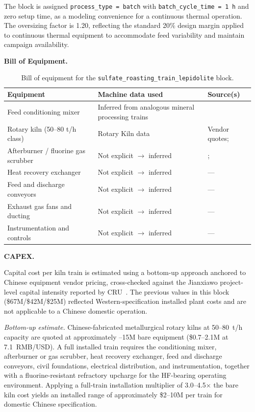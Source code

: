 The block is assigned \texttt{process\_type = batch} with \texttt{batch\_cycle\_time = 1 h} and zero setup time, as a modeling convenience for a continuous thermal operation. The oversizing factor is 1.20, reflecting the standard 20\% design margin applied to continuous thermal equipment to accommodate feed variability and maintain campaign availability.

\medskip
\noindent\textbf{Bill of Equipment.}\quad
\begin{table}[h!]
\caption{Bill of equipment for the \texttt{sulfate\_roasting\_train\_lepidolite} block.}
\centering
\begin{tabular}{>{\raggedright\arraybackslash}p{5.2cm}
                >{\raggedright\arraybackslash}p{4cm}
                >{\raggedright\arraybackslash}p{4.5cm}}
\toprule
\textbf{Equipment} & \textbf{Machine data used} & \textbf{Source(s)} \\
\midrule
Feed conditioning mixer & Inferred from analogous mineral processing trains & \citet{dengSystematicReviewSulfate2026} \\
Rotary kiln (50--80 t/h class) & Rotary Kiln data & Vendor quotes; \citet{jiaoKeyTechnologiesDevelopment2024} \\
Afterburner / fluorine gas scrubber & Not explicit $\rightarrow$ inferred & \citet{dengSystematicReviewSulfate2026}; \citet{yanExtractionLithiumLepidolite2012} \\
Heat recovery exchanger & Not explicit $\rightarrow$ inferred & --- \\
Feed and discharge conveyors & Not explicit $\rightarrow$ inferred & --- \\
Exhaust gas fans and ducting & Not explicit $\rightarrow$ inferred & --- \\
Instrumentation and controls & Not explicit $\rightarrow$ inferred & --- \\
\bottomrule
\end{tabular}
\end{table}

\medskip
\noindent\textbf{CAPEX.}\quad

Capital cost per kiln train is estimated using a bottom-up approach anchored to Chinese equipment vendor pricing, cross-checked against the Jianxiawo project-level capital intensity reported by CRU~\cite{zhangChinaHasDomestic2025}. The previous values in this block (\$67M/\$42M/\$25M) reflected Western-specification installed plant costs and are not applicable to a Chinese domestic operation.
 
\textit{Bottom-up estimate.} Chinese-fabricated metallurgical rotary kilns at 50--80~t/h capacity are quoted at approximately --15M bare equipment (\$0.7--2.1M at 7.1~RMB/USD). A full installed train requires the conditioning mixer, afterburner or gas scrubber, heat recovery exchanger, feed and discharge conveyors, civil foundations, electrical distribution, and instrumentation, together with a fluorine-resistant refractory upcharge for the HF-bearing operating environment. Applying a full-train installation multiplier of 3.0--4.5$\times$ the bare kiln cost yields an installed range of approximately \$2--10M per train for domestic Chinese specification.
 

